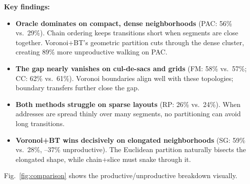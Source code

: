 \documentclass[conference]{IEEEtran}
\begin{document}
\textbf{Key findings:}
\begin{itemize}
\item \textbf{Oracle dominates on compact, dense neighborhoods} (PAC: 56\% vs.\ 29\%). Chain ordering keeps transitions short when segments are close together. Voronoi+BT's geometric partition cuts through the dense cluster, creating 89\% more unproductive walking on PAC.
\item \textbf{The gap nearly vanishes on cul-de-sacs and grids} (FM: 58\% vs.\ 57\%; CC: 62\% vs.\ 61\%). Voronoi boundaries align well with these topologies; boundary transfers further close the gap.
\item \textbf{Both methods struggle on sparse layouts} (RP: 26\% vs.\ 24\%). When addresses are spread thinly over many segments, no partitioning can avoid long transitions.
\item \textbf{Voronoi+BT wins decisively on elongated neighborhoods} (SG: 59\% vs.\ 28\%, --37\% unproductive). The Euclidean partition naturally bisects the elongated shape, while chain+slice must snake through it.
\end{itemize}

Fig.~\ref{fig:comparison} shows the productive/unproductive breakdown visually.
\end{document}
